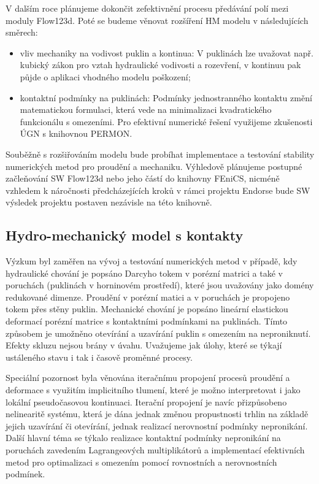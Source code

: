 \documentclass[11pt,a4paper]{article}
\begin{document}
\begin{onehalfspacing}
V dalším roce plánujeme dokončit zefektivnění procesu předávání polí mezi moduly Flow123d.
Poté se budeme věnovat rozšíření HM modelu v následujících směrech:
\begin{itemize}
    \item vliv mechaniky na vodivost puklin a kontinua: V puklinách lze uvažovat např. kubický zákon pro vztah hydraulické vodivosti a rozevření, v kontinuu pak půjde o aplikaci vhodného modelu poškození;
    \item kontaktní podmínky na puklinách: Podmínky jednostranného kontaktu změní matematickou formulaci, která vede na minimalizaci kvadratického funkcionálu s omezeními. Pro efektivní numerické řešení využijeme zkušenosti ÚGN s knihovnou PERMON.
\end{itemize}
Souběžně s rozšiřováním modelu bude probíhat implementace a testování stability numerických metod pro proudění a mechaniku. Výhledově plánujeme postupné začleňování SW Flow123d nebo jeho částí do knihovny FEniCS, nicméně vzhledem k náročnosti předcházejících kroků v rámci projektu Endorse bude SW výsledek projektu postaven nezávisle na této knihovně.


\subsection{Hydro-mechanický model s kontakty}
Výzkum byl zaměřen na vývoj a testování numerických metod v případě, kdy hydraulické chování je popsáno Darcyho tokem v porézní matrici a také v poruchách (puklinách v horninovém prostředí), které jsou uvažovány jako domény redukované dimenze. Proudění v porézní matici a v poruchách je propojeno tokem přes stěny puklin. Mechanické chování je popsáno lineární elastickou deformací porézní matrice s kontaktními podmínkami na puklinách. Tímto způsobem je umožněno otevírání a uzavírání puklin s omezením na neproniknutí. Efekty skluzu nejsou brány v úvahu. Uvažujeme jak úlohy, které se týkají ustáleného stavu i tak i časově proměnné procesy.

Speciální pozornost byla věnována iteračnímu propojení procesů proudění a deformace s využitím implicitního tlumení, které je možno interpretovat i jako lokální pseudočasovou kontinuaci. Iterační propojení je navíc přizpůsobeno nelinearitě systému, která je dána jednak změnou propustnosti trhlin na základě jejich uzavírání či otevírání, jednak realizací nerovnostní podmínky nepronikání.
Další hlavní téma se týkalo realizace kontaktní podmínky nepronikání na poruchách zavedením Lagrangeových multiplikátorů a implementací efektivních metod pro optimalizaci s omezením pomocí rovnostních a nerovnostních podmínek.


\end{onehalfspacing}
\end{document}
